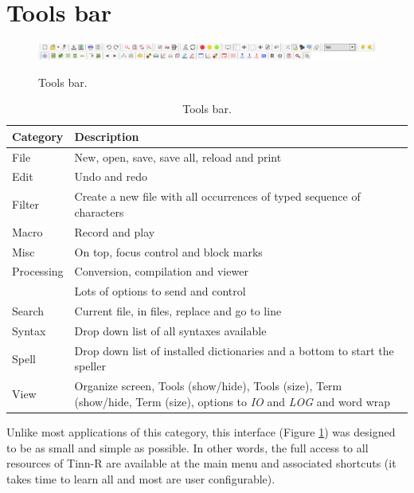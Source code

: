 
\hypertarget{working_toolsbar}{}
\section{Tools bar}

\begin{figure}[H]
  \includegraphics[width=\headwidth]{./res/toolsbar.png}\\
  \caption{Tools bar.}
  \label{fig:toolsbar}
\end{figure}

\begin{table}[H]
  \begin{footnotesize}
    \begin{tabularx}{\textwidth}{>{\hsize=0.3\hsize}X>{\hsize=0.7\hsize}X}\\
      \hline
      \textbf{Category} & \textbf{Description} \\
      \hline
      File & New, open, save, save all, reload and print \\
      Edit & Undo and redo \\
      Filter & Create a new file with all occurrences of typed sequence of characters \\
      Macro & Record and play \\
      Misc & On top, focus control and block marks \\
      Processing & Conversion, compilation and viewer \\
      \RR{} & Lots of options to send and control \RR{} \\
      Search & Current file, in files, replace and go to line \\
      Syntax & Drop down list of all syntaxes available \\
      Spell & Drop down list of installed dictionaries and a bottom to start the speller \\
      View & Organize screen, Tools (show/hide), Tools (size), Term (show/hide, Term (size), options to \textit{IO} and \textit{LOG} and word wrap \\
      \hline
    \end{tabularx}
  \end{footnotesize}
  \caption{Tools bar.}
  \label{tab:toolsbar}
\end{table}

Unlike most applications of this category, this interface
(Figure \ref{fig:toolsbar})
was designed to be
as small and simple as possible. In other words, the full access to all
resources of Tinn-R are available at the main menu and associated shortcuts
(it takes time to learn all and most are user configurable).

